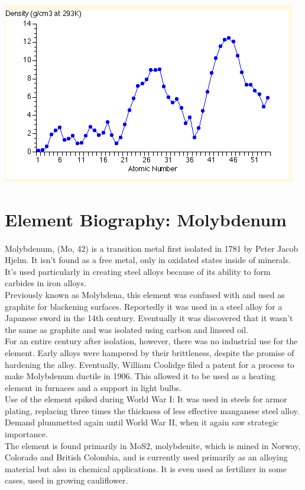 \documentclass[fleqn,titlepage]{article}
\begin{document}
  \includegraphics{./an_density}

\section*{Element Biography: Molybdenum}
  \paragraph{} Molybdenum, (Mo, 42) is a transition metal first isolated in 1781 by Peter Jacob Hjelm. It isn't found as a free metal, only in oxidated states inside of minerals. It's used particularly in creating steel alloys because of its ability to form carbides in iron alloys. \\
  Previously known as Molybdena, this element was confused with and used as graphite for blackening surfaces. Reportedly it was used in a steel alloy for a Japanese sword in the 14th century. Eventually it was discovered that it wasn't the same as graphite and was isolated using carbon and linseed oil. \\
  For an entire century after isolation, however, there was no industrial use for the element. Early alloys were hampered by their brittleness, despite the promise of hardening the alloy. Eventually, William Coolidge filed a patent for a process to make Molybdenum ductile in 1906. This allowed it to be used as a heating element in furnaces and a support in light bulbs. \\
  Use of the element spiked during World War I: It was used in steels for armor plating, replacing three times the thickness of less effective manganese steel alloy. Demand plummetted again until World War II, when it again saw strategic importance. \\
  The element is found primarily in MoS2, molybdenite, which is mined in Norway, Colorado and British Colombia, and is currently used primarily as an alloying material but also in chemical applications. It is even used as fertilizer in some cases, used in growing cauliflower.
\end{document}
